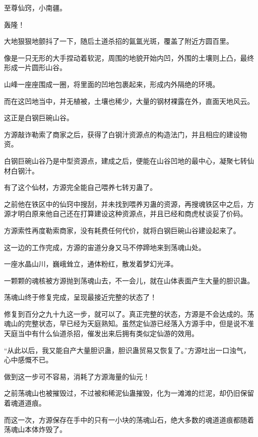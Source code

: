 
\begin{this_body}



至尊仙窍，小南疆。

轰隆！

大地狠狠地颤抖了一下，随后土道杀招的氤氲光斑，覆盖了附近方圆百里。

像是一只无形的大手捏动着软泥，周围的地貌开始内凹，外围的土壤则上凸，最终形成一片圆形山谷。

山峰一座座围成一圈，将里面的凹地包裹起来，形成内外隔绝的环境。

而在这凹地当中，并无植被，土壤也稀少，大量的钢材裸露在外，直面天地风云。

这正是白钢巨碗山谷。

方源敲诈勒索了商家之后，获得了白钢汁资源点的构造法门，并且相应的建设物资。

白钢巨碗山谷乃是中型资源点，建成之后，便能在山谷凹地的最中心，凝聚七转仙材白钢汁。

有了这个仙材，方源完全能自己喂养七转刃蛊了。

之前他在铁区中的仙窍中搜刮，并未找到喂养刃蛊的资源，再搜魂铁区中之后，方源才明白原来他自己还在打算建设这种资源点，并且已经和商虎杖谈妥了价码。

方源索性再度勒索商家，没有耗费任何代价，就将白钢巨碗山谷建设起来了。

这一边的工作完成，方源的宙道分身又马不停蹄地来到荡魂山处。

一座水晶山川，巍峨耸立，通体粉红，散发着梦幻光泽。

一颗颗的魂核被方源抛到荡魂山去，不一会儿，就在山体表面产生大量的胆识蛊。

荡魂山终于修复完成，呈现最接近完整的状态了！

修复到百分之九十九这一步，就可以了。真正完整的状态，方源是不会达成的。荡魂山的完整状态，早已经为天庭熟知。虽然定仙游已经落入方源手中，但是说不准天庭当中有什么仙道杀招，催发出来后拥有类似定仙游的效用。

“从此以后，我又能自产大量胆识蛊，胆识蛊贸易又恢复了。”方源吐出一口浊气，心中感慨不已。

做到这一步可不容易，消耗了方源海量的仙元！

之前荡魂山也被摧毁过，不过被和稀泥仙蛊摧毁，化为一滩滩的烂泥，却仍旧保留着魂道道痕。

而这一次，方源保存在手中的只有一小块的荡魂山石，绝大多数的魂道道痕都随着荡魂山本体炸毁了。


\end{this_body}
